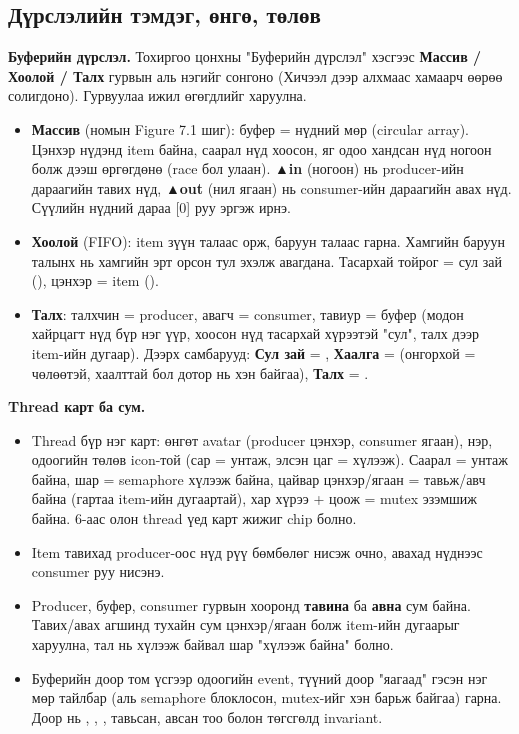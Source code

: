 \documentclass[12pt,a4paper]{article}
\begin{document}
\subsection{Дүрслэлийн тэмдэг, өнгө, төлөв}
\textbf{Буферийн дүрслэл.} Тохиргоо цонхны "Буферийн дүрслэл" хэсгээс \textbf{Массив / Хоолой / Талх} гурвын аль нэгийг сонгоно (Хичээл дээр алхмаас хамаарч өөрөө солигдоно). Гурвуулаа ижил өгөгдлийг харуулна.
\begin{itemize}
  \item \textbf{Массив} (номын Figure 7.1 шиг): буфер = нүдний мөр (circular array). Цэнхэр нүдэнд item байна, саарал нүд хоосон, яг одоо хандсан нүд ногоон болж дээш өргөгдөнө (race бол улаан). \textbf{▲in} (ногоон) нь producer-ийн дараагийн тавих нүд, \textbf{▲out} (нил ягаан) нь consumer-ийн дараагийн авах нүд. Сүүлийн нүдний дараа [0] руу эргэж ирнэ.
  \item \textbf{Хоолой} (FIFO): item зүүн талаас орж, баруун талаас гарна. Хамгийн баруун талынх нь хамгийн эрт орсон тул эхэлж авагдана. Тасархай тойрог = сул зай (), цэнхэр = item ().
  \item \textbf{Талх}: талхчин = producer, авагч = consumer, тавиур = буфер (модон хайрцагт нүд бүр нэг үүр, хоосон нүд тасархай хүрээтэй "сул", талх дээр item-ийн дугаар). Дээрх самбарууд: \textbf{Сул зай} = , \textbf{Хаалга} =  (онгорхой = чөлөөтэй, хаалттай бол дотор нь хэн байгаа), \textbf{Талх} = .
\end{itemize}

\textbf{Thread карт ба сум.}
\begin{itemize}
  \item Thread бүр нэг карт: өнгөт avatar (producer цэнхэр, consumer ягаан), нэр, одоогийн төлөв icon-той (сар = унтаж, элсэн цаг = хүлээж). Саарал = унтаж байна, шар = semaphore хүлээж байна, цайвар цэнхэр/ягаан = тавьж/авч байна (гартаа item-ийн дугаартай), хар хүрээ + цоож = mutex эзэмшиж байна. 6-аас олон thread үед карт жижиг chip болно.
  \item Item тавихад producer-оос нүд рүү бөмбөлөг нисэж очно, авахад нүднээс consumer руу нисэнэ.
  \item Producer, буфер, consumer гурвын хооронд \textbf{тавина} ба \textbf{авна} сум байна. Тавих/авах агшинд тухайн сум цэнхэр/ягаан болж item-ийн дугаарыг харуулна, тал нь хүлээж байвал шар "хүлээж байна" болно.
  \item Буферийн доор том үсгээр одоогийн event, түүний доор "яагаад" гэсэн нэг мөр тайлбар (аль semaphore блоклосон, mutex-ийг хэн барьж байгаа) гарна. Доор нь , , , тавьсан, авсан тоо болон төгсгөлд invariant.
\end{itemize}
\end{document}
